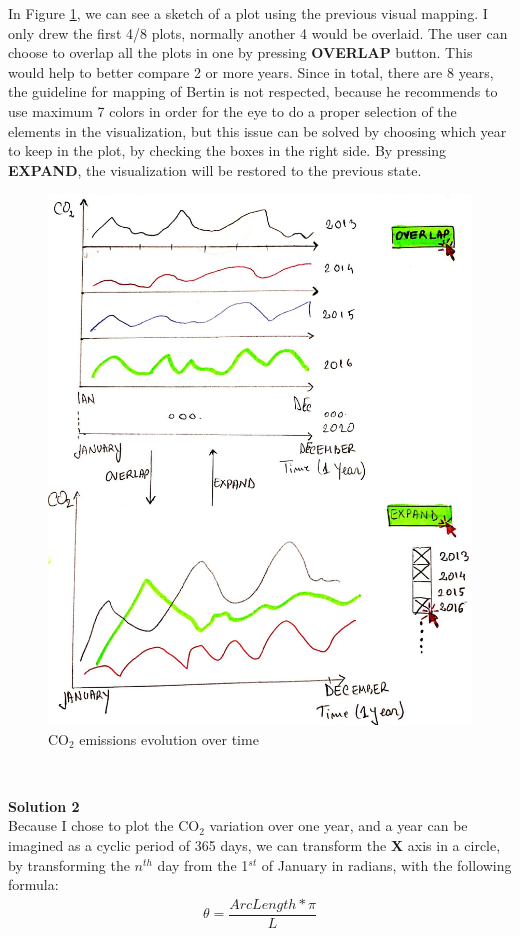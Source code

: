 \documentclass{article}
\begin{document}
In Figure \ref{fig:positive_selection}, we can see a sketch of a plot using the previous visual mapping. I only drew the first 4/8 plots, normally another 4 would be overlaid. The user can choose to overlap all the plots in one by pressing \textbf{OVERLAP} button. This would help to better compare 2 or more years. Since in total, there are 8 years, the guideline for mapping of Bertin\cite{bertin} is not respected, because he recommends to use maximum 7 colors in order for the eye to do a proper selection of the elements in the visualization, but this issue can be solved  by choosing which year to keep in the plot, by checking the boxes in the right side. By pressing \textbf{EXPAND}, the visualization will be restored to the previous state.

\begin{figure}[H]
	\centering
	\includegraphics[scale=0.23]{img/1.jpg}
	\caption{CO${_2}$ emissions evolution over time }
	\label{fig:positive_selection}
\end{figure}\

\large{\textbf{Solution 2}}\\
Because I chose to plot the CO${_2}$ variation over one year, and a year can be imagined as a cyclic period of 365 days, we can transform the \textbf{X} axis in a circle, by transforming the $n^{th}$ day from the 1$^{st}$ of January in radians, with the following formula:
\begin{eqnarray}
	\theta = \dfrac{ArcLength * \pi}{L}
\end{eqnarray}
\end{document}
